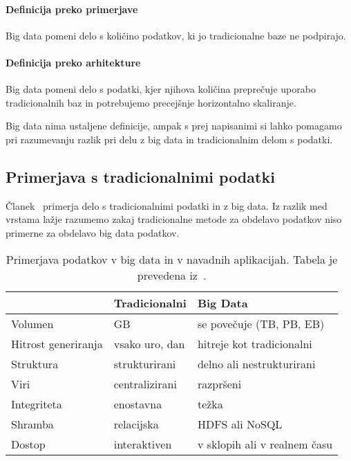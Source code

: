 \paragraph{Definicija preko primerjave}
Big data pomeni delo s količino podatkov, ki jo tradicionalne baze ne podpirajo.

\paragraph{Definicija preko arhitekture}
Big data pomeni delo s podatki, kjer njihova količina preprečuje uporabo
tradicionalnih baz in potrebujemo precejšnje horizontalno skaliranje.

\bigskip

\noindent Big data nima ustaljene definicije, ampak s prej napisanimi si lahko pomagamo pri razumevanju razlik
pri delu z big data in tradicionalnim delom s podatki.

\subsection{Primerjava s tradicionalnimi podatki}

Članek~\cite{toward_scalable_systems_big_data_analytics} primerja delo s tradicionalnimi podatki in z big data.
Iz razlik med vrstama lažje razumemo zakaj tradicionalne metode za obdelavo podatkov niso primerne za obdelavo big data podatkov.

\begin{table}[H]
    \centering
    \begin{tabular}{l l l}
                            & Tradicionalni  & Big Data                     \\
        \hline
        Volumen             & GB             & se povečuje (TB, PB, EB)     \\
        Hitrost generiranja & vsako uro, dan & hitreje kot tradicionalni    \\
        Struktura           & strukturirani  & delno ali nestrukturirani    \\
        Viri                & centralizirani & razpršeni                    \\
        Integriteta         & enostavna      & težka                        \\
        Shramba             & relacijska     & HDFS ali NoSQL               \\
        Dostop              & interaktiven   & v sklopih ali v realnem času
    \end{tabular}
    \caption{Primerjava podatkov v big data in v navadnih aplikacijah. Tabela je prevedena iz~\cite{toward_scalable_systems_big_data_analytics}.}
    \label{table:big-data-vs-normal}
\end{table}

